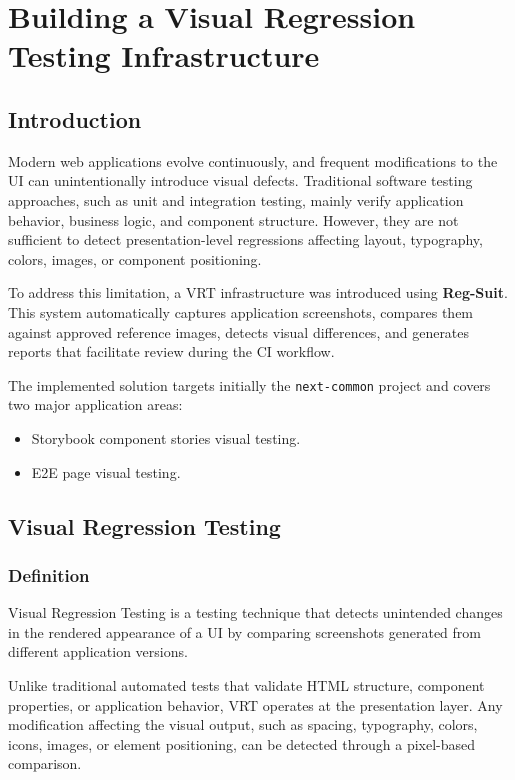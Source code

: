 \chapter{Building a Visual Regression Testing Infrastructure}

\section{Introduction}

Modern web applications evolve continuously, and frequent modifications to the \acs{UI} can unintentionally introduce visual defects. Traditional software testing approaches, such as unit and integration testing, mainly verify application behavior, business logic, and component structure. However, they are not sufficient to detect presentation-level regressions affecting layout, typography, colors, images, or component positioning.

To address this limitation, a \acs{VRT} infrastructure was introduced using \textbf{Reg-Suit}. This system automatically captures application screenshots, compares them against approved reference images, detects visual differences, and generates reports that facilitate review during the \acs{CI} workflow.

The implemented solution targets initially the \texttt{next-common} project and covers two major application areas:

\begin{itemize}
    \item Storybook component stories visual testing.
    \item \acf{E2E} page visual testing.
\end{itemize}

\section{Visual Regression Testing}

\subsection{Definition}

Visual Regression Testing is a testing technique that detects unintended changes in the rendered appearance of a \ac{UI} by comparing screenshots generated from different application versions.

Unlike traditional automated tests that validate HTML structure, component properties, or application behavior, \ac{VRT} operates at the presentation layer. Any modification affecting the visual output, such as spacing, typography, colors, icons, images, or element positioning, can be detected through a pixel-based comparison.

